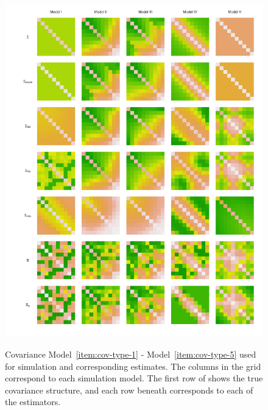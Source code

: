 
\begin{figure}[H] 
\centering
\caption{Covariance Model~\ref{item:cov-type-1} - Model~\ref{item:cov-type-5} used for simulation and corresponding estimates. The columns in the grid correspond to each simulation model. The first row of shows the true covariance structure, and each row beneath corresponds to each of the estimators.}
  \includegraphics[width = 1\textwidth]{../img/chapter-4/cov-estimate-lattice}\label{fig:cov-estimate-lattice}
\end{figure}